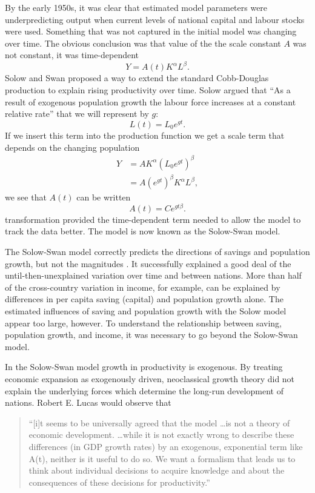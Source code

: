 By the early 1950s, it was clear that estimated model parameters were underpredicting output when current levels of national capital and labour stocks were used. Something that was not captured in the initial model was changing over time. The obvious conclusion was that value of the the scale constant $A$  was not constant, it was time-dependent  
 \[Y=A(t)K^\alpha L^\beta.\]
Solow and Swan proposed a way to extend the standard \gls{Cobb-Douglas} production to explain rising productivity over time. 
Solow  argued that ``As a result of exogenous population growth the labour force increases at a constant relative rate'' that we will represent by  $g$:
  \[L(t)= L_0e^{gt}.\] 
If we insert this term into the production function we get a scale term that depends on the changing population 
\begin{eqnarray}
Y &= AK^\alpha (L_0e^{gt})^\beta\nonumber\\
  &= A(e^{gt})^{\beta}K^\alpha L^\beta,
\label{eqn-solow-swan3}
\end{eqnarray}
we see that $A(t)$ can be written
 \[A(t)=Ce^{gt\beta}.\]
transformation provided the time-dependent term needed to allow the model to track the data better. The model is now known as the \gls{Solow-Swan model}. 

The \gls{Solow-Swan model} correctly predicts the directions of savings and population growth, but not the magnitudes \cite{mankiwContributionEmpiricsEconomic1992}. It successfully explained a good deal of the until-then-unexplained variation over time and between nations. More than half of the cross-country variation in income, for example,  can be explained by differences in per capita saving (capital) and population growth alone. The estimated influences of saving and population growth with the Solow model appear too large, however. To understand the relationship between saving, population growth, and income, it was necessary to go beyond the  Solow-Swan model.

In the Solow-Swan model growth in productivity is exogenous. By treating economic expansion as exogenously driven, neoclassical growth theory did not explain %
the underlying forces which determine the long-run development of nations.   Robert E. Lucas \cite{lucasMechanicsEconomicDevelopment1988} would observe that \begin{quotation}
``[i]t seems to be universally agreed that the model \dots is not a theory of economic development.   \dots while it is not exactly wrong to describe these differences (in GDP  growth rates) by an exogenous, exponential term like A(t), neither is it useful to do so. We want a formalism that leads us to think about individual decisions to acquire knowledge and about the consequences of these decisions for productivity.'' \end{quotation}


